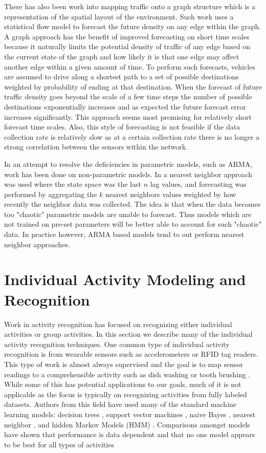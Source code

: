 There has also been work into mapping traffic onto a graph structure which is a representation of the spatial layout of the environment\cite{Kriegel2008}.  Such work uses a statistical flow model to forecast the future density on any edge within the graph.  A graph approach has the benefit of improved forecasting on short time scales because it naturally limits the potential density of traffic of any edge based on the current state of the graph and how likely it is that one edge may affect another edge within a given amount of time.  To perform such forecasts, vehicles are assumed to drive along a shortest path to a set of possible destinations weighted by probability of ending at that destination.  When the forecast of future traffic density goes beyond the scale of a few time steps the number of possible destinations exponentially increases and as expected the future forecast error increases significantly.  This approach seems most promising for relatively short forecast time scales.  Also, this style of forecasting is not feasible if the data collection rate is relatively slow as at a certain collection rate there is no longer a strong correlation between the sensors within the network.

In an attempt to resolve the deficiencies in parametric models, such as ARMA, work has been done on non-parametric models.  In \cite{Smith2002,Zhang2009} a nearest neighbor approach was used where the state space was the last $n$ lag values, and forecasting was performed by aggregating the $k$ nearest neighbors values weighted by how recently the neighbor data was collected.  The idea is that when the data becomes too "chaotic" parametric models are unable to forecast.  Thus models which are not trained on pre-set parameters will be better able to account for such "chaotic" data.  In practice however, ARMA based models tend to out perform nearest neighbor approaches.  

\section{Individual Activity Modeling and Recognition}
Work in activity recognition has focused on recognizing either individual activities or group activities.  In this section we describe many of the individual activity recognition techniques.  One common type of individual activity recognition is from wearable sensors such as accelerometers or RFID tag readers.  This type of work is almost always supervised and the goal is to map sensor readings to a comprehensible activity such as dish washing or tooth brushing \cite{Wang2009,Bao2004}.  While some of this has potential applications to our goals, much of it is not applicable as the focus is typically on recognizing activities from fully labeled datasets.  Authors from this field have used many of the standard machine learning models: decision trees \cite{Bao2004}, support vector machines \cite{Krishnan2008,Bao2004,Lustrek2009}, naive Bayes \cite{Bao2004,Lustrek2009}, nearest neighbor \cite{Bao2004,Lustrek2009}, and hidden Markov Models (HMM) \cite{Wang2009,Oliver2002}.  Comparisons amongst models have shown that performance is data dependent and that no one model appears to be best for all types of activities \cite{Bao2004,Lustrek2009}


